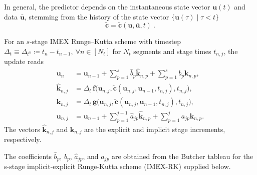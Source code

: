 \noindent
In general, the predictor depends on the instantaneous state vector $\mathbf{u}(t)$ and data $\bar{\mathbf{u}}$, stemming from the history of the state vector $\{\mathbf{u}(\tau) \mid \tau < t \}$
\begin{equation}
    \tilde{\mathbf{c}} = \tilde{\mathbf{c}}(\mathbf{u}, \bar{\mathbf{u}}, t) \ .
\end{equation}

For an $s$-stage IMEX Runge--Kutta scheme with timestep $\Delta_t \equiv \Delta_{t^n} \coloneqq t_n - t_{n-1}, \ \forall n\in[N_t]$ for $N_t$ segments and stage times $t_{n,j}$, the update reads \cite{Huang_2019}
\begin{subequations}\label{eq:ch2-imex-rk}
    \begin{align}
        \mathbf{u}_n           & = \mathbf{u}_{n-1} + \sum_{p=1}^{s} \hat{b}_p \hat{\mathbf{k}}_{n,p} + \sum_{p=1}^{s} b_p \mathbf{k}_{n,p}, \label{eq:ch2-imex-rk-a}                     \\
        \hat{\mathbf{k}}_{n,j} & = \Delta_t \, \mathbf{f}\bigl(\mathbf{u}_{n,j}, \tilde{\mathbf{c}}(\mathbf{u}_{n,j}, \mathbf{u}_{n-1}, t_{n,j}), t_{n,j}\bigr), \label{eq:ch2-imex-rk-b} \\
        \mathbf{k}_{n,j}       & = \Delta_t \, \mathbf{g}\bigl(\mathbf{u}_{n,j}, \tilde{\mathbf{c}}(\mathbf{u}_{n,j}, \mathbf{u}_{n-1}, t_{n,j}), t_{n,j}\bigr), \label{eq:ch2-imex-rk-c} \\
        \mathbf{u}_{n,j}       & = \mathbf{u}_{n-1}
        + \sum_{p=1}^{j-1} \hat{a}_{jp} \hat{\mathbf{k}}_{n,p}
        + \sum_{p=1}^{j} a_{jp} \mathbf{k}_{n,p}. \label{eq:ch2-imex-rk-d}
    \end{align}
\end{subequations}
The vectors $\hat{\mathbf{k}}_{n,j}$ and $\mathbf{k}_{n,j}$ are the explicit and implicit stage increments, respectively.

\noindent
The coefficients $\hat{b}_p$, $b_p$, $\hat{a}_{jp}$, and $a_{jp}$ are obtained from the Butcher tableau for the s-stage implicit-explicit Runge-Kutta scheme (IMEX-RK) supplied below.

